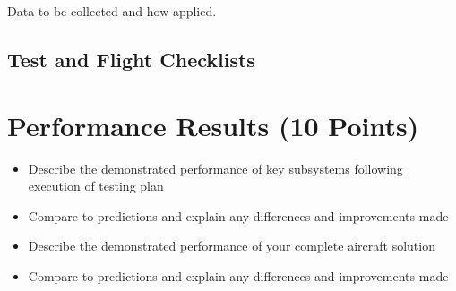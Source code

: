 \documentclass[report]{byu-aero}
\begin{document}
Data to be collected and how applied.

\subsection{Test and Flight Checklists}


\section{Performance Results (10 Points)}
\label{sec:PerformanceResults}
\begin{itemize}
\item Describe the demonstrated performance of key subsystems following execution of testing plan
\item Compare to predictions and explain any differences and improvements made
\item Describe the demonstrated performance of your complete aircraft solution
\item Compare to predictions and explain any differences and improvements made
\end{itemize}


%
\end{document}
